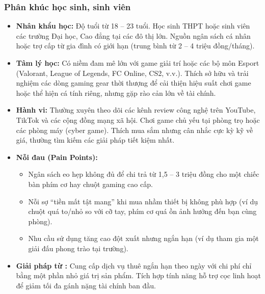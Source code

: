 \subsubsection{Phân khúc học sinh, sinh viên}
\begin{itemize}
    \item \textbf{Nhân khẩu học:} Độ tuổi từ 18 -- 23 tuổi. Học sinh THPT hoặc sinh viên các trường Đại học, Cao đẳng tại các đô thị lớn. Nguồn ngân sách cá nhân hoặc trợ cấp từ gia đình có giới hạn (trung bình từ 2 -- 4 triệu đồng/tháng).
    \item \textbf{Tâm lý học:} Có niềm đam mê lớn với game giải trí hoặc các bộ môn Esport (Valorant, League of Legends, FC Online, CS2, v.v.). Thích sở hữu và trải nghiệm các dòng gaming gear thời thượng để cải thiện hiệu suất chơi game hoặc thể hiện cá tính riêng, nhưng gặp rào cản lớn về tài chính.
    \item \textbf{Hành vi:} Thường xuyên theo dõi các kênh review công nghệ trên YouTube, TikTok và các cộng đồng mạng xã hội. Chơi game chủ yếu tại phòng trọ hoặc các phòng máy (cyber game). Thích mua sắm nhưng cân nhắc cực kỳ kỹ về giá, thường tìm kiếm các giải pháp tiết kiệm nhất.
    \item \textbf{Nỗi đau (Pain Points):}
    \begin{itemize}
        \item Ngân sách eo hẹp không đủ để chi trả từ 1,5 -- 3 triệu đồng cho một chiếc bàn phím cơ hay chuột gaming cao cấp.
        \item Nỗi sợ ``tiền mất tật mang'' khi mua nhầm thiết bị không phù hợp (ví dụ chuột quá to/nhỏ so với cỡ tay, phím cơ quá ồn ảnh hưởng đến bạn cùng phòng).
        \item Nhu cầu sử dụng tăng cao đột xuất nhưng ngắn hạn (ví dụ tham gia một giải đấu phong trào tại trường).
    \end{itemize}
    \item \textbf{Giải pháp từ \projectname{}:} Cung cấp dịch vụ thuê ngắn hạn theo ngày với chi phí chỉ bằng một phần nhỏ giá trị sản phẩm. Tích hợp tính năng hỗ trợ cọc linh hoạt để giảm tối đa gánh nặng tài chính ban đầu.
\end{itemize}

